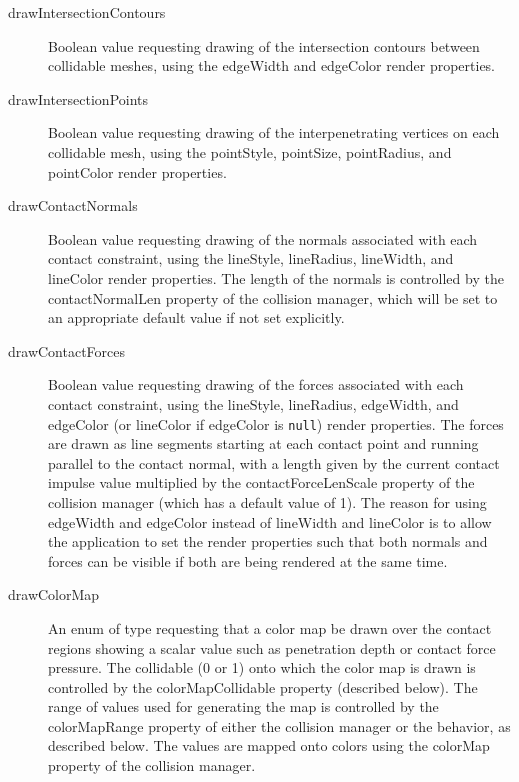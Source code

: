 \begin{description}

\item[drawIntersectionContours]\mbox{}

Boolean value requesting drawing of the intersection contours between
collidable meshes, using the {\sf edgeWidth} and {\sf edgeColor} render
properties.

\item[drawIntersectionPoints]\mbox{}

Boolean value requesting drawing of the interpenetrating vertices on
each collidable mesh, using the {\sf pointStyle}, {\sf pointSize}, {\sf
pointRadius}, and {\sf pointColor} render properties.

\item[drawContactNormals]\mbox{}

Boolean value requesting drawing of the normals associated with each
contact constraint, using the {\sf lineStyle}, {\sf lineRadius}, {\sf
lineWidth}, and {\sf lineColor} render properties. The length of the
normals is controlled by the {\sf contactNormalLen} property of the
collision manager, which will be set to an appropriate default value
if not set explicitly.

\item[drawContactForces]\mbox{}

Boolean value requesting drawing of the forces associated with each
contact constraint, using the {\sf lineStyle}, {\sf lineRadius}, {\sf
edgeWidth}, and {\sf edgeColor} (or {\sf lineColor} if {\sf edgeColor}
is {\tt null}) render properties.  The forces are drawn as line
segments starting at each contact point and running parallel to the
contact normal, with a length given by the current contact impulse
value multiplied by the {\sf contactForceLenScale} property of the
collision manager (which has a default value of 1).  The reason for
using {\sf edgeWidth} and {\sf edgeColor} instead of {\sf lineWidth}
and {\sf lineColor} is to allow the application to set the render
properties such that both normals and forces can be visible if both
are being rendered at the same time.

\item[drawColorMap]\mbox{}

An enum of type
requesting that a color map be drawn over the contact regions showing
a scalar value such as penetration depth or contact force pressure.
The collidable (0 or 1) onto which the color map is drawn is
controlled by the {\sf colorMapCollidable} property (described
below). The range of values used for generating the map is controlled
by the {\sf colorMapRange} property of either the collision manager or
the behavior, as described below.  The values are mapped onto colors
using the {\sf colorMap} property of the collision manager.


\end{description}
